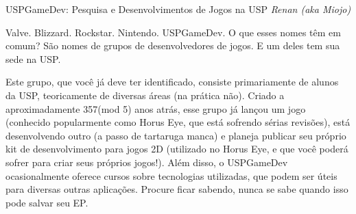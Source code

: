 \begin{secao}{USPGameDev: Pesquisa e Desenvolvimentos de Jogos na USP}
{\em Renan (aka Miojo)}

Valve. Blizzard. Rockstar. Nintendo. USPGameDev. O que esses nomes têm em comum? São nomes de grupos de desenvolvedores de jogos. E um deles tem sua sede na USP.

Este grupo, que você já deve ter identificado, consiste primariamente de alunos da USP, teoricamente de diversas áreas (na prática não). Criado a aproximadamente 357(mod 5) anos atrás, esse grupo já lançou um jogo (conhecido popularmente como Horus Eye, que está sofrendo sérias revisões), está desenvolvendo outro (a passo de tartaruga manca) e planeja publicar seu próprio kit de desenvolvimento para jogos 2D (utilizado no Horus Eye, e que você poderá sofrer para criar seus próprios jogos!). Além disso, o USPGameDev ocasionalmente oferece cursos sobre tecnologias utilizadas, que podem ser úteis para diversas outras aplicações. Procure ficar sabendo, nunca se sabe quando isso pode salvar seu EP. 

\end{secao}

